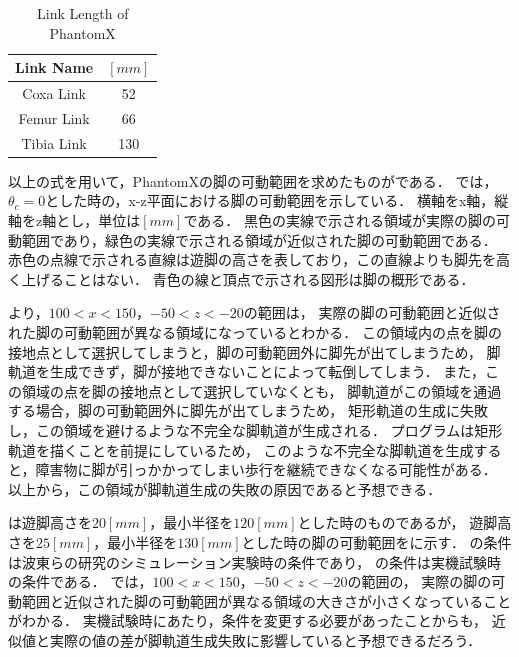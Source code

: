 \begin{table}[h]
	\caption{Link Length of PhantomX}
	\label{tab:link_len_phantom_x}  %
	\begin{center}
   	\begin{tabular}{|c||c|} \hline  %
      Link Name & $[mm]$ \\ \hline  %
      Coxa Link & 52  \\ \hline  %
      Femur Link & 66  \\ \hline  %
      Tibia Link & 130  \\ \hline  %
    \end{tabular}
  \end{center}
\end{table}

\newpage

以上の式を用いて，PhantomXの脚の可動範囲を求めたものがである．
では，$\theta_c = 0$とした時の，x-z平面における脚の可動範囲を示している．
横軸をx軸，縦軸をz軸とし，単位は$[mm]$である．
黒色の実線で示される領域が実際の脚の可動範囲であり，緑色の実線で示される領域が近似された脚の可動範囲である．
赤色の点線で示される直線は遊脚の高さを表しており，この直線よりも脚先を高く上げることはない．
青色の線と頂点で示される図形は脚の概形である．

より，$100 < x < 150$，$-50 < z < -20$の範囲は，
実際の脚の可動範囲と近似された脚の可動範囲が異なる領域になっているとわかる．
この領域内の点を脚の接地点として選択してしまうと，脚の可動範囲外に脚先が出てしまうため，
脚軌道を生成できず，脚が接地できないことによって転倒してしまう．
また，この領域の点を脚の接地点として選択していなくとも，
脚軌道がこの領域を通過する場合，脚の可動範囲外に脚先が出てしまうため，
矩形軌道の生成に失敗し，この領域を避けるような不完全な脚軌道が生成される．
プログラムは矩形軌道を描くことを前提にしているため，
このような不完全な脚軌道を生成すると，障害物に脚が引っかかってしまい歩行を継続できなくなる可能性がある．
以上から，この領域が脚軌道生成の失敗の原因であると予想できる．

は遊脚高さを$20 [mm]$，最小半径を$120 [mm]$とした時のものであるが，
遊脚高さを$25 [mm]$，最小半径を$130 [mm]$とした時の脚の可動範囲をに示す．
の条件は波東らの研究\cite{Hato_Graph_search}のシミュレーション実験時の条件であり，
の条件は実機試験時の条件である．
では，$100 < x < 150$，$-50 < z < -20$の範囲の，
実際の脚の可動範囲と近似された脚の可動範囲が異なる領域の大きさが小さくなっていることがわかる．
実機試験時にあたり，条件を変更する必要があったことからも，
近似値と実際の値の差が脚軌道生成失敗に影響していると予想できるだろう．

